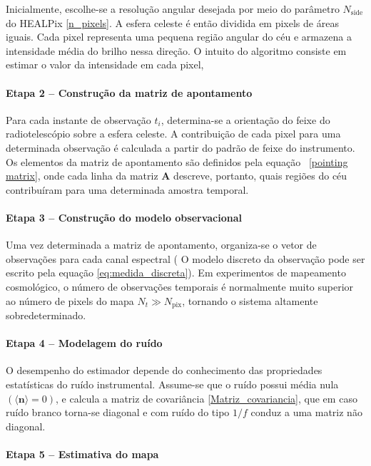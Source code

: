 Inicialmente, escolhe-se a resolução angular desejada por meio do parâmetro $N_{\mathrm{side}}$ do HEALPix \eqref{n_pixels}. A esfera celeste é então dividida em pixels de áreas iguais. Cada pixel representa uma pequena região angular do céu e armazena a intensidade média do brilho nessa direção. O intuito do algoritmo consiste em estimar o valor da intensidade em cada pixel,

\paragraph*{Etapa 2 -- Construção da matriz de apontamento}

Para cada instante de observação $t_i$, determina-se a orientação do feixe do radiotelescópio sobre a esfera celeste. A contribuição de cada pixel para uma determinada observação é calculada a partir do padrão de feixe do instrumento. Os elementos da matriz de apontamento são definidos pela equação ~\eqref{pointing matrix}, onde cada linha da matriz $\mathbf A$ descreve, portanto, quais regiões do céu contribuíram para uma determinada amostra temporal.

\paragraph*{Etapa 3 -- Construção do modelo observacional}

Uma vez determinada a matriz de apontamento, organiza-se o vetor de observações para cada canal espectral ( O modelo discreto da observação pode ser escrito pela equação \eqref{eq:medida_discreta}). Em experimentos de mapeamento cosmológico, o número de observações temporais é normalmente muito superior ao número de pixels do mapa $N_t\gg N_{\mathrm{pix}}$, tornando o sistema altamente sobredeterminado.

\paragraph*{Etapa 4 -- Modelagem do ruído}

O desempenho do estimador depende do conhecimento das propriedades estatísticas do ruído instrumental. Assume-se que o ruído possui média nula $(\langle\mathbf n\rangle=0)$, e calcula a matriz de covariância  \eqref{Matriz_covariancia}, que em caso ruído branco torna-se diagonal e com ruído do tipo $1/f$ conduz a uma matriz não diagonal.

\paragraph*{Etapa 5 -- Estimativa do mapa}

